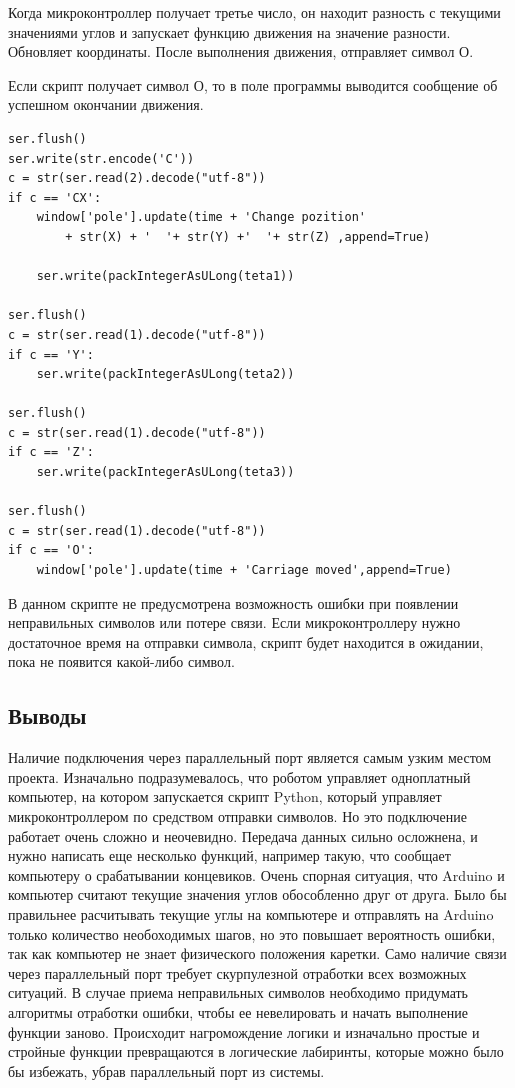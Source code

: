 Когда микроконтроллер получает третье число, он находит разность с текущими значениями углов и запускает функцию движения на значение разности. Обновляет координаты. После выполнения движения, отправляет символ О.

Если скрипт получает символ О, то в поле программы выводится сообщение об успешном окончании движения.



\begin{lstlisting}[style=python,caption=Команда на перемещение каретки]
ser.flush()
ser.write(str.encode('C'))
c = str(ser.read(2).decode("utf-8"))
if c == 'CX':
    window['pole'].update(time + 'Change pozition'
        + str(X) + '  '+ str(Y) +'  '+ str(Z) ,append=True)

    ser.write(packIntegerAsULong(teta1))

ser.flush()
c = str(ser.read(1).decode("utf-8"))
if c == 'Y':
    ser.write(packIntegerAsULong(teta2))

ser.flush()
c = str(ser.read(1).decode("utf-8"))
if c == 'Z':
    ser.write(packIntegerAsULong(teta3))

ser.flush()
c = str(ser.read(1).decode("utf-8"))
if c == 'O':
    window['pole'].update(time + 'Carriage moved',append=True)

\end{lstlisting}

В данном скрипте не предусмотрена возможность ошибки при появлении неправильных символов или потере связи. Если микроконтроллеру нужно достаточное время на отправки символа, скрипт будет находится в ожидании, пока не появится какой-либо символ.

\subsection{Выводы}

Наличие подключения через параллельный порт является самым узким местом проекта. Изначально подразумевалось, что роботом управляет одноплатный компьютер, на котором запускается скрипт Python, который управляет микроконтроллером по средством отправки символов. Но это подключение работает очень сложно и неочевидно. Передача данных сильно осложнена, и нужно написать еще несколько функций, например такую, что  сообщает компьютеру о срабатывании концевиков. Очень спорная ситуация, что Arduino и компьютер считают текущие значения углов обособленно друг от друга. Было бы правильнее расчитывать текущие углы на компьютере и отправлять на Arduino только количество необоходимых  шагов, но это повышает вероятность ошибки, так как компьютер не знает физического положения каретки. Само наличие связи через параллельный порт требует скурпулезной отработки всех возможных ситуаций. В случае приема неправильных символов необходимо придумать алгоритмы отработки ошибки, чтобы ее невелировать и начать выполнение функции заново. Происходит нагромождение логики и изначально простые и стройные функции превращаются в логические лабиринты, которые можно было бы избежать, убрав параллельный порт из системы.

